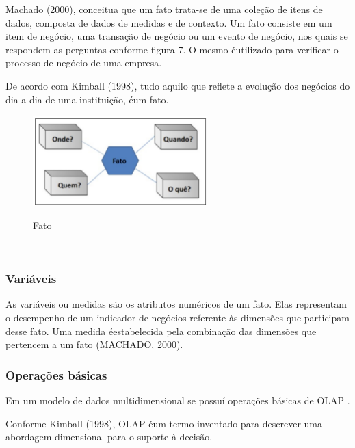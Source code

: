Machado (2000), conceitua que um fato trata-se de uma cole\c{c}\~{a}o de itens de dados, composta de dados de medidas e de contexto. Um fato consiste em um item de neg\'{o}cio, uma transa\c{c}\~{a}o de neg\'{o}cio ou um evento de neg\'{o}cio, nos quais se respondem as perguntas conforme figura 7. O mesmo \'{e}utilizado para verificar o processo de neg\'{o}cio de uma empresa.

De acordo com Kimball (1998), tudo aquilo que reflete a evolu\c{c}\~{a}o dos neg\'{o}cios do dia-a-dia de uma institui\c{c}\~{a}o, \'{e}um fato.

\begin{figure}[H]
	\vspace*{0,2cm}
    \centering
    \caption{Fato}
    \includegraphics[width=0.6\textwidth]{./04-figuras/figura-07}
    \label{fig:ilustfig07}
\end{figure}
\vspace*{-0,9cm}
{\raggedright {}} \\

\subsubsection{Vari\'{a}veis}

As vari\'{a}veis ou medidas s\~{a}o os atributos num\'{e}ricos de um fato. Elas representam o desempenho de um indicador de neg\'{o}cios referente \`{a}s dimens\~{o}es que participam desse fato. Uma medida \'{e}estabelecida pela combina\c{c}\~{a}o das dimens\~{o}es que pertencem a um fato (MACHADO, 2000).

\subsubsection{Opera\c{c}\~{o}es b\'{a}sicas}

Em um modelo de dados multidimensional se possu\'{i} opera\c{c}\~{o}es b\'{a}sicas de 
OLAP .

Conforme Kimball (1998), OLAP \'{e}um termo inventado para descrever uma abordagem dimensional para o suporte \`{a} decis\~{a}o.

